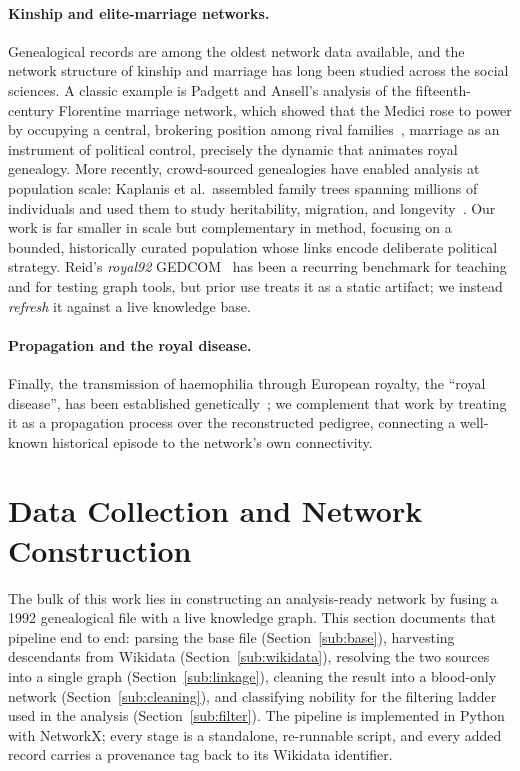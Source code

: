 \paragraph{Kinship and elite-marriage networks.}
Genealogical records are among the oldest network data available, and the network
structure of kinship and marriage has long been studied across the social
sciences. A classic example is Padgett and Ansell's analysis of the fifteenth-%
century Florentine marriage network, which showed that the Medici rose to power by
occupying a central, brokering position among rival families~\cite{padgett1993medici}, marriage as an instrument of political control, precisely the dynamic that
animates royal genealogy. More recently, crowd-sourced genealogies have enabled
analysis at population scale: Kaplanis et al.\ assembled family trees spanning
millions of individuals and used them to study heritability, migration, and
longevity~\cite{kaplanis2018quantitative}. Our work is far smaller in scale but
complementary in method, focusing on a bounded, historically curated
population whose links encode deliberate political strategy.
Reid's \emph{royal92} GEDCOM~\cite{reid1992} has been a recurring benchmark for
teaching and for testing graph tools, but prior use treats it as a static
artifact; we instead \emph{refresh} it against a live knowledge base.

\paragraph{Propagation and the royal disease.}
Finally, the transmission of haemophilia through European royalty, the ``royal
disease'', has been established genetically~\cite{rogaev2009royal}; we complement
that work by treating it as a propagation process over the reconstructed pedigree,
connecting a well-known historical episode to the network's own connectivity.

\section{Data Collection and Network Construction}
\label{sec:data}

The bulk of this work lies in constructing an analysis-ready network by fusing a 1992 genealogical file with a live knowledge graph. This section documents that pipeline end to end: parsing the base file (Section~\ref{sub:base}), harvesting descendants from Wikidata (Section~\ref{sub:wikidata}), resolving the two sources into a single graph (Section~\ref{sub:linkage}), cleaning the result into a blood-only network (Section~\ref{sub:cleaning}), and classifying nobility for the filtering ladder used in the analysis (Section~\ref{sub:filter}). The pipeline is implemented in Python with NetworkX; every stage is a standalone, re-runnable script, and every added record carries a provenance tag back to its Wikidata identifier.

